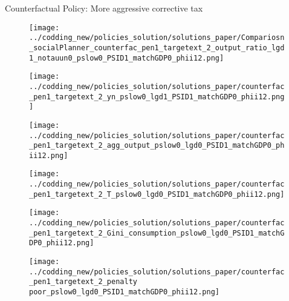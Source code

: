 \documentclass[11pt,aspectratio=169]{beamer}
\begin{document}
	
	\begin{frame}{Counterfactual Policy: More aggressive corrective tax}
		\hypertarget{moreaggtaun}{}
		\begin{figure}	
			
			\begin{minipage}[]{0.32\textwidth}
				\texttt{[image: ../codding\_new/policies\_solution/solutions\_paper/Compariosn\_socialPlanner\_counterfac\_pen1\_targetext\_2\_output\_ratio\_lgd1\_notauun0\_pslow0\_PSID1\_matchGDP0\_phii12.png]}
			\end{minipage}		
			\begin{minipage}[]{0.32\textwidth}
				\texttt{[image: ../codding\_new/policies\_solution/solutions\_paper/counterfac\_pen1\_targetext\_2\_yn\_pslow0\_lgd1\_PSID1\_matchGDP0\_phii12.png]}
			\end{minipage}	
			\begin{minipage}[]{0.32\textwidth}
				\texttt{[image: ../codding\_new/policies\_solution/solutions\_paper/counterfac\_pen1\_targetext\_2\_agg\_output\_pslow0\_lgd0\_PSID1\_matchGDP0\_phii12.png]}
			\end{minipage}	\begin{minipage}[]{0.32\textwidth}
				\texttt{[image: ../codding\_new/policies\_solution/solutions\_paper/counterfac\_pen1\_targetext\_2\_T\_pslow0\_lgd0\_PSID1\_matchGDP0\_phii12.png]}
			\end{minipage}
			\begin{minipage}[]{0.32\textwidth}
				\texttt{[image: ../codding\_new/policies\_solution/solutions\_paper/counterfac\_pen1\_targetext\_2\_Gini\_consumption\_pslow0\_lgd0\_PSID1\_matchGDP0\_phii12.png]}
			\end{minipage}		
			\begin{minipage}[]{0.32\textwidth}
				\texttt{[image: ../codding\_new/policies\_solution/solutions\_paper/counterfac\_pen1\_targetext\_2\_penalty poor\_pslow0\_lgd0\_PSID1\_matchGDP0\_phii12.png]}

\end{minipage}
\end{figure}
\end{frame}
\end{document}
